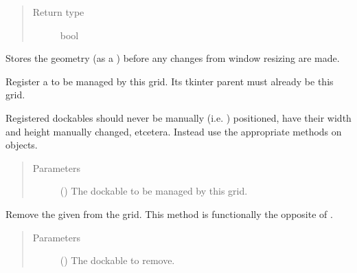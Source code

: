 \documentclass[letterpaper,10pt,english]{sphinxmanual}
\begin{document}
\begin{fulllineitems}
\begin{fulllineitems}
\begin{quote}
\begin{description}
\item[{Return type}] \leavevmode
bool

\end{description}\end{quote}

\end{fulllineitems}


\begin{fulllineitems}
\label{\detokenize{api:gui.core.Grid.orig_geometry}}
Stores the geometry (as a ) before any changes from window resizing are made.

\end{fulllineitems}


\begin{fulllineitems}
\label{\detokenize{api:gui.core.Grid.register_dockable}}
Register a  to be managed by this grid. Its tkinter parent must already be this grid.

Registered dockables should never be manually (i.e. ) positioned, have their width
and height manually changed, etcetera. Instead use the appropriate methods on  objects.
\begin{quote}\begin{description}
\item[{Parameters}] \leavevmode
{} () \textendash{} The dockable to be managed by this grid.

\end{description}\end{quote}

\end{fulllineitems}


\begin{fulllineitems}
\label{\detokenize{api:gui.core.Grid.remove_dockable}}
Remove the given   from the grid. This method is functionally the opposite of
.
\begin{quote}\begin{description}
\item[{Parameters}] \leavevmode
{} () \textendash{} The dockable to remove.


\end{description}
\end{quote}
\end{fulllineitems}
\end{fulllineitems}
\end{document}
